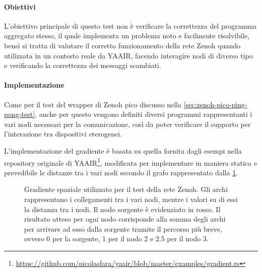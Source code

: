 \paragraph{Obiettivi}
L'obiettivo principale di questo test non è verificare la correttezza del programma
aggregato stesso, il quale implementa un problema noto e facilmente risolvibile,
bensì si tratta di valutare il corretto funzionamento della rete Zenoh quando
utilizzata in un contesto reale da \ac{YAAIR}, facendo interagire nodi di diverso
tipo e verificando la correttezza dei messaggi scambiati.

\paragraph{Implementazione}
Come per il test del wrapper di Zenoh pico discusso nella \cref{sec:zenoh-pico-ping-pong-test},
anche per questo vengono definiti diversi programmi rappresentanti i vari nodi
necessari per la comunicazione, così da poter verificare il supporto per l'interazione
tra dispositivi eterogenei.

L'implementazione del gradiente è basata su quella fornita dagli esempi nella
repository originale di \ac{YAAIR}\footnote{\url{https://github.com/nicolasfara/yaair/blob/master/examples/gradient.rs}},
modificata per implementare in maniera statica e prevedibile le distanze tra i
vari nodi secondo il grafo rappresentato dalla \cref{fig:gradient-test-graph}.

\begin{figure}[H]
    \centering
    \caption[Gradiente spaziale utilizzato per il test della rete Zenoh.]{
    Gradiente spaziale utilizzato per il test della rete Zenoh.
    Gli archi rappresentano i collegamenti tra i vari nodi, mentre i valori
    su di essi la distanza tra i nodi. Il nodo sorgente è evidenziato in rosso.
    Il risultato atteso per ogni nodo corrisponde alla somma degli archi per arrivare
    ad esso dalla sorgente tramite il percorso più breve, ovvero 0 per la sorgente,
    1 per il nodo 2 e 2.5 per il nodo 3.}
    \label{fig:gradient-test-graph}
\end{figure}

